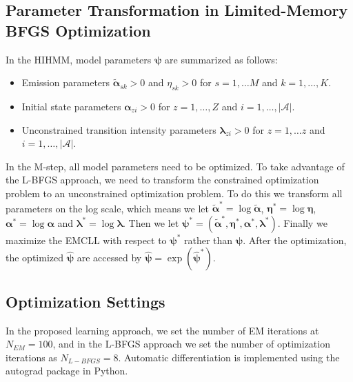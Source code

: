\documentclass{article}
\begin{document}
\subsection{Parameter Transformation in Limited-Memory BFGS Optimization} \label{sec:pars_transformation}
In the HIHMM, model parameters $\bm \psi$ are summarized as follows:
\begin{itemize}
	\item Emission parameters $\tilde{\bm \alpha}_{sk} > 0$ and $\eta_{sk} > 0$ for $s = 1, \ldots M$ and $k = 1,\ldots, K$.
	\item Initial state parameters $\bm \alpha_{zi} > 0$ for $z = 1,\ldots, Z$ and $i = 1, \ldots, |\mathcal{A}|$.
	\item Unconstrained transition intensity parameters $\bm \lambda_{zi} > 0$ for $z = 1,\ldots z$ and $i = 1, \ldots, |\mathcal{A}|$.
\end{itemize}

In the M-step, all model parameters need to be optimized. To take advantage of the L-BFGS approach, we need to transform the constrained optimization problem to an unconstrained optimization problem. To do this we transform all parameters on the log scale, which means we let $\tilde{\bm \alpha}^* = \log {\tilde{\bm \alpha}}$, $\bm\eta^* = \log \bm \eta$, $\bm \alpha^* = \log \bm \alpha$ and $\bm \lambda^* = \log \bm \lambda$. Then we let $\bm \psi^* = (\tilde{\bm \alpha}^*, \bm \eta^*, \bm \alpha^*, \bm \lambda^*)$. Finally we maximize the EMCLL with respect to $\bm \psi^*$ rather than $\bm \psi$. After the optimization, the optimized $\hat{\bm \psi}$ are accessed by $\hat{\bm \psi} = \exp(\hat{\bm \psi}^*)$.

\subsection{Optimization Settings} \label{sec:opt_set}
In the proposed learning approach, we set the number of EM iterations at $N_{EM} = 100$, and in the L-BFGS approach we set the number of optimization iterations as $N_{L-BFGS} = 8$.  Automatic differentiation is implemented using the autograd package \cite{Maclaurin_2016} in Python.
\end{document}

